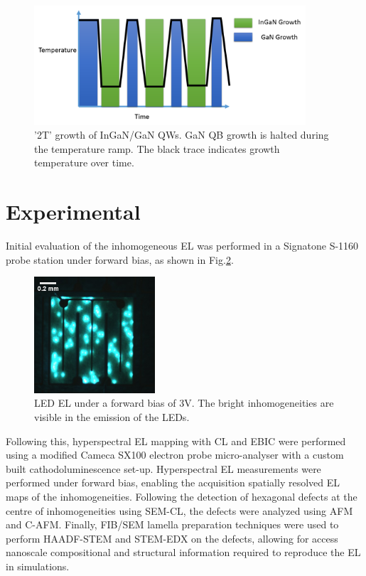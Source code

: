 \begin{figure}[!ht]
	\centering
	\includegraphics[width=0.9\textwidth]{Figs/Ch3/2T}
	\caption[h] {'2T' growth of InGaN/GaN QWs. GaN QB growth is halted during the temperature ramp. The black trace indicates growth temperature over time.}
	\label{2T}
\end{figure}

\FloatBarrier 

\section{Experimental}

Initial evaluation of the inhomogeneous EL was performed in a Signatone S-1160 probe station under forward bias, as shown in Fig.\ref{probe}.

\begin{figure}[h]
	\centering
	\includegraphics[width=0.4\textwidth]{Figs/Ch3/5608.png}
	\caption {LED EL under a forward bias of 3V. The bright inhomogeneities are visible in the emission of the LEDs. }
	\label{probe}
\end{figure}
\FloatBarrier


Following this, hyperspectral EL mapping with CL and EBIC were performed using a modified Cameca SX100 electron probe micro-analyser with a custom built cathodoluminescence set-up. Hyperspectral EL measurements were performed under forward bias, enabling the acquisition spatially resolved EL maps of the inhomogeneities. Following the detection of hexagonal defects at the centre of inhomogeneities using SEM-CL, the defects were analyzed using AFM and C-AFM. Finally, FIB/SEM lamella preparation techniques were used to perform HAADF-STEM and STEM-EDX on the defects, allowing for access nanoscale compositional and structural information required to reproduce the EL in simulations.


